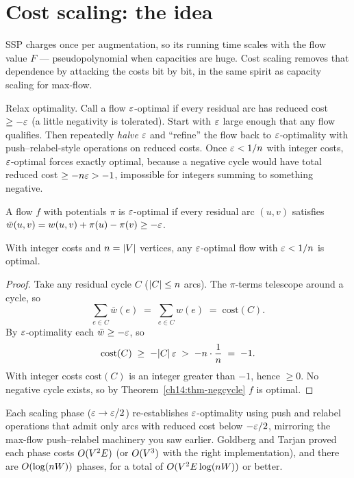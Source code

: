 \section{Cost scaling: the idea}
\label{ch14:scaling}

SSP charges once per augmentation, so its running time scales with the flow value $F$ --- pseudopolynomial when capacities are huge. Cost scaling removes that dependence by attacking the costs bit by bit, in the same spirit as capacity scaling for max-flow.

\begin{intuitionbox}
Relax optimality. Call a flow $\varepsilon$-optimal if every residual arc has reduced cost $\ge -\varepsilon$ (a little negativity is tolerated). Start with $\varepsilon$ large enough that any flow qualifies. Then repeatedly \emph{halve} $\varepsilon$ and ``refine'' the flow back to $\varepsilon$-optimality with push--relabel-style operations on reduced costs. Once $\varepsilon < 1/n$ with integer costs, $\varepsilon$-optimal forces exactly optimal, because a negative cycle would have total reduced cost $\ge -n\varepsilon > -1$, impossible for integers summing to something negative.
\end{intuitionbox}

\begin{definition}\label{ch14:def-eps}
A flow $f$ with potentials $\pi$ is $\varepsilon$-optimal if every residual arc $(u,v)$ satisfies $\bar w(u,v)=w(u,v)+\pi(u)-\pi(v)\ge -\varepsilon$.
\end{definition}

\begin{theorem}\label{ch14:thm-scaling}
With integer costs and $n=\lvert V\rvert$ vertices, any $\varepsilon$-optimal flow with $\varepsilon < 1/n$ is optimal.
\end{theorem}

\begin{proof}
Take any residual cycle $C$ ($\lvert C\rvert \le n$ arcs). The $\pi$-terms telescope around a cycle, so
\[
  \sum_{e\in C}\bar w(e) \;=\; \sum_{e\in C} w(e) \;=\; \mathrm{cost}(C).
\]
By $\varepsilon$-optimality each $\bar w \ge -\varepsilon$, so
\[
  \mathrm{cost}(C) \;\ge\; -\lvert C\rvert\,\varepsilon \;>\; -n\cdot\frac{1}{n} \;=\; -1.
\]
With integer costs $\mathrm{cost}(C)$ is an integer greater than $-1$, hence $\ge 0$. No negative cycle exists, so by Theorem~\ref{ch14:thm-negcycle} $f$ is optimal.
\end{proof}

Each scaling phase ($\varepsilon \to \varepsilon/2$) re-establishes $\varepsilon$-optimality using push and relabel operations that admit only arcs with reduced cost below $-\varepsilon/2$, mirroring the max-flow push--relabel machinery you saw earlier. Goldberg and Tarjan proved each phase costs $O(V^2E)$ (or $O(V^3)$ with the right implementation), and there are $O(\log(nW))$ phases, for a total of $O(V^2 E \log(nW))$ or better.

